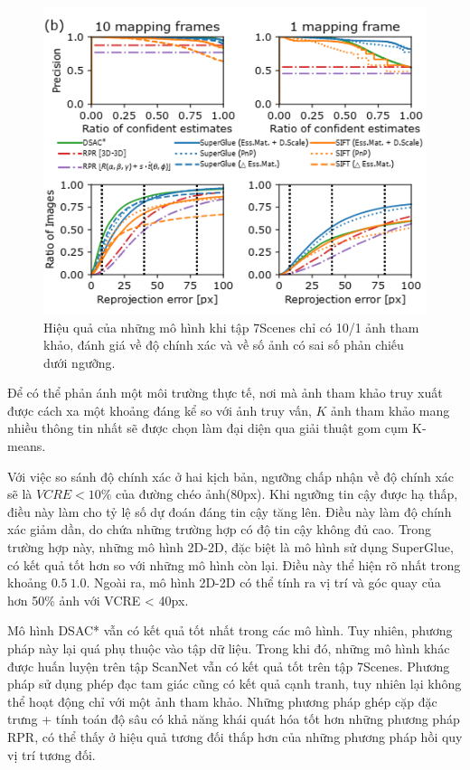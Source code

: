 \begin{figure}[H]
    \centering
    \includegraphics[scale=0.8]{pics/Proposal/partial_7scene.png}
    \caption[Hiệu quả của các mô hình khi giới hạn ảnh tham khảo]{Hiệu quả của những mô hình khi tập 7Scenes chỉ có 10/1 ảnh tham khảo, đánh giá về độ chính xác và về số ảnh có sai số phản chiếu dưới ngưỡng.}
\end{figure}

Để có thể phản ánh một môi trường thực tế, nơi mà ảnh tham khảo truy xuất được cách xa một khoảng đáng kể so với ảnh truy vấn, $K$ ảnh tham khảo mang nhiều thông tin nhất sẽ được chọn làm đại diện qua giải thuật gom cụm K-means.

Với việc so sánh độ chính xác ở hai kịch bản, ngưỡng chấp nhận về độ chính xác sẽ là $VCRE<10\%$ của đường chéo ảnh(80px). Khi ngưỡng tin cậy được hạ thấp, điều này làm cho tỷ lệ số dự đoán đáng tin cậy tăng lên. Điều này làm độ chính xác giảm dần, do chứa những trường hợp có độ tin cậy không đủ cao. Trong trường hợp này, những mô hình 2D-2D, đặc biệt là mô hình sử dụng SuperGlue, có kết quả tốt hơn so với những mô hình còn lại. Điều này thể hiện rõ nhất trong khoảng $0.5~1.0$. Ngoài ra, mô hình 2D-2D có thể tính ra vị trí và góc quay của hơn 50\% ảnh với VCRE < 40px.

Mô hình DSAC* vẫn có kết quả tốt nhất trong các mô hình. Tuy nhiên, phương pháp này lại quá phụ thuộc vào tập dữ liệu. Trong khi đó, những mô hình khác được huấn luyện trên tập ScanNet vẫn có kết quả tốt trên tập 7Scenes. Phương pháp sử dụng phép đạc tam giác cũng có kết quả cạnh tranh, tuy nhiên lại không thể hoạt động chỉ với một ảnh tham khảo. Những phương pháp ghép cặp đặc trưng + tính toán độ sâu có khả năng khái quát hóa tốt hơn những phương pháp RPR, có thể thấy ở hiệu quả tương đối thấp hơn của những phương pháp hồi quy vị trí tương đối.

